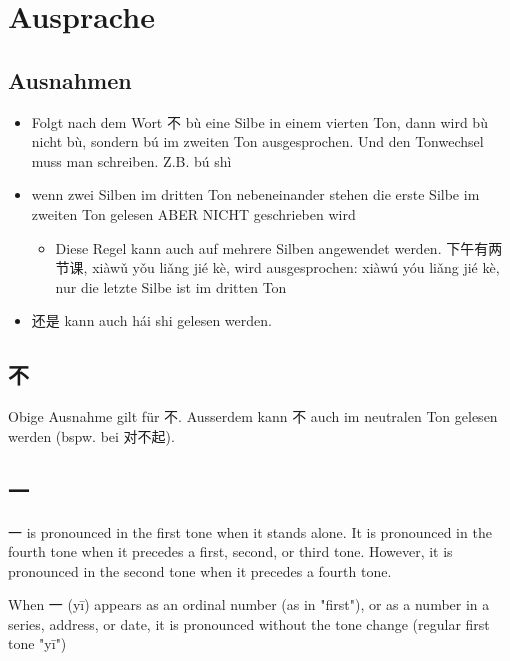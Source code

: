 \documentclass[UTF8]{ctexart}
\begin{document}



\tableofcontents

\section{Ausprache}

\subsection{Ausnahmen}

\begin{itemize}
    \item Folgt nach dem Wort 不 bù eine Silbe in einem vierten Ton, dann wird bù nicht bù,
    sondern bú im zweiten Ton ausgesprochen. Und den Tonwechsel muss man
    schreiben. Z.B. bú shì
    \item wenn zwei Silben im dritten Ton nebeneinander stehen die erste Silbe im zweiten
    Ton gelesen ABER NICHT geschrieben wird{
        \begin{itemize}
            \item Diese Regel kann auch auf mehrere Silben angewendet werden. 下午有两节课, xiàwǔ yǒu liǎng jié kè, wird ausgesprochen: xiàwú yóu liǎng jié kè, nur die letzte Silbe ist im dritten Ton 
        \end{itemize}
    }
    \item 还是 kann auch hái shi gelesen werden.
\end{itemize}

\subsection{不}

Obige Ausnahme gilt für 不. Ausserdem kann 不 auch im neutralen Ton gelesen werden (bspw. bei 对不起).

\subsection{一}

一 is pronounced in the first tone when it stands alone. It is pronounced in the fourth tone when it precedes a first, second, or third tone. However, it is pronounced in the second tone when it precedes a fourth tone.

When 一 (yī) appears as an ordinal number (as in "first"), or as a number in a series, address, or date, it is pronounced without the tone change (regular first tone "yī")
\end{document}
